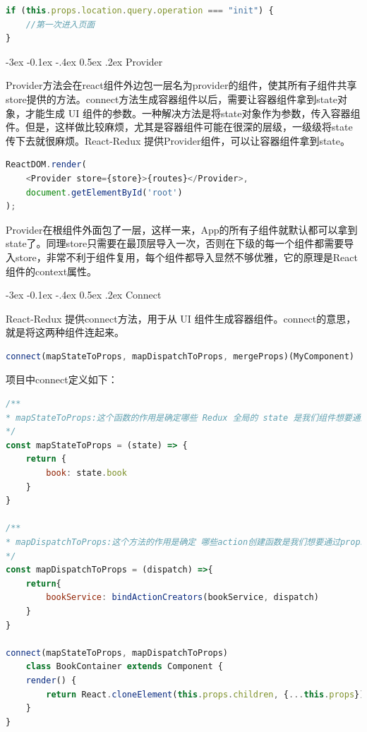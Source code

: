 \documentclass[12pt]{book}
\makeatletter
\numberwithin{dummy}{section}
\theoremstyle{ocrenumbox}
\theoremstyle{blacknumex}
\theoremstyle{blacknumbox}
\theoremstyle{ocrenum}
\renewcommand{\subsection}{\@startsection {subsection}{2}{\z@}
	{-3ex \@plus -0.1ex \@minus -.4ex}
	{0.5ex \@plus.2ex }
	{\normalfont\sffamily\bfseries}}
\makeatother
\begin{document}
\begin{lstlisting}[language=Javascript]
if (this.props.location.query.operation === "init") {
	//第一次进入页面
}
\end{lstlisting}

\subsection{Provider}

Provider方法会在react组件外边包一层名为provider的组件，使其所有子组件共享store提供的方法。connect方法生成容器组件以后，需要让容器组件拿到state对象，才能生成 UI 组件的参数。一种解决方法是将state对象作为参数，传入容器组件。但是，这样做比较麻烦，尤其是容器组件可能在很深的层级，一级级将state传下去就很麻烦。React-Redux 提供Provider组件，可以让容器组件拿到state。

\begin{lstlisting}[language=Javascript]
ReactDOM.render(
	<Provider store={store}>{routes}</Provider>,
	document.getElementById('root')
);
\end{lstlisting}

Provider在根组件外面包了一层，这样一来，App的所有子组件就默认都可以拿到state了。同理store只需要在最顶层导入一次，否则在下级的每一个组件都需要导入store，非常不利于组件复用，每个组件都导入显然不够优雅，它的原理是React组件的context属性。

\subsection{Connect}

React-Redux 提供connect方法，用于从 UI 组件生成容器组件。connect的意思，就是将这两种组件连起来。

\begin{lstlisting}[language=Javascript]
connect(mapStateToProps, mapDispatchToProps, mergeProps)(MyComponent)
\end{lstlisting}

项目中connect定义如下：

\begin{lstlisting}[language=Javascript]
/**
* mapStateToProps:这个函数的作用是确定哪些 Redux 全局的 state 是我们组件想要通过 props 获取
*/
const mapStateToProps = (state) => {
	return {
		book: state.book
	}
}

/**
* mapDispatchToProps:这个方法的作用是确定 哪些action创建函数是我们想要通过props获取
*/
const mapDispatchToProps = (dispatch) =>{
	return{
		bookService: bindActionCreators(bookService, dispatch)
	}
}

connect(mapStateToProps, mapDispatchToProps)
	class BookContainer extends Component {
	render() {
		return React.cloneElement(this.props.children, {...this.props});
	}
}
\end{lstlisting}
\end{document}
